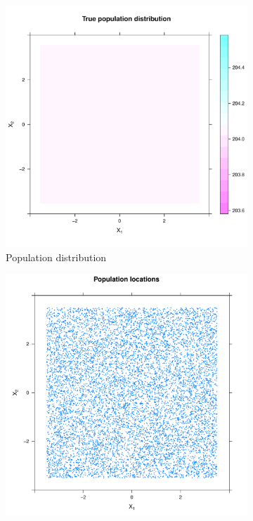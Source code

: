 \begin{figure}[htbp]
    \centering
    \begin{subfigure}[t]{0.32\textwidth}
    \includegraphics[width=\textwidth]{output/population-heatmap}
    \caption{Population distribution}
    \end{subfigure}
    \begin{subfigure}[t]{0.32\textwidth}
    \includegraphics[width=\textwidth]{output/population-points}

\end{subfigure}
\end{figure}
